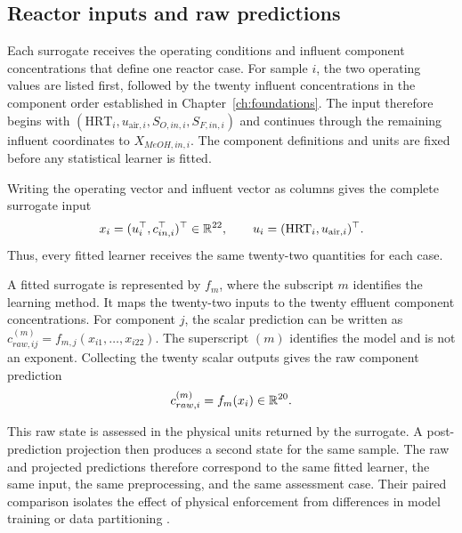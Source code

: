 \subsection{Reactor inputs and raw predictions}

Each surrogate receives the operating conditions and influent component concentrations that define one reactor case. For sample $i$, the two operating values are listed first, followed by the twenty influent concentrations in the component order established in Chapter~\ref{ch:foundations}. The input therefore begins with $(\mathrm{HRT}_i,u_{\mathrm{air},i},S_{O,in,i},S_{F,in,i})$ and continues through the remaining influent coordinates to $X_{MeOH,in,i}$. The component definitions and units are fixed before any statistical learner is fitted.

Writing the operating vector and influent vector as columns gives the complete surrogate input
\begin{equation}
\equationname{Reactor surrogate inputs from operation and influent concentrations}
x_i=(u_i^\top,c_{in,i}^\top)^\top\in\mathbb{R}^{22},\qquad
u_i=(\mathrm{HRT}_i,u_{\mathrm{air},i})^\top.
\label{eq:surrogate_input_vector}
\end{equation}
Thus, every fitted learner receives the same twenty-two quantities for each case.

A fitted surrogate is represented by $f_m$, where the subscript $m$ identifies the learning method. It maps the twenty-two inputs to the twenty effluent component concentrations. For component $j$, the scalar prediction can be written as
$c_{raw,ij}^{(m)}=f_{m,j}(x_{i1},\ldots,x_{i22})$.
The superscript $(m)$ identifies the model and is not an exponent. Collecting the twenty scalar outputs gives the raw component prediction
\begin{equation}
\equationname{Raw component-state prediction from a fitted surrogate}
c_{raw,i}^{(m)}=f_m(x_i)\in\mathbb{R}^{20}.
\label{eq:surrogate_raw_state}
\end{equation}

This raw state is assessed in the physical units returned by the surrogate. A post-prediction projection then produces a second state for the same sample. The raw and projected predictions therefore correspond to the same fitted learner, the same input, the same preprocessing, and the same assessment case. Their paired comparison isolates the effect of physical enforcement from differences in model training or data partitioning \citep{SturmSilva2024,KircherVotsmeier2025}.

